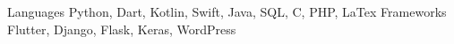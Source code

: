 
\begin{cvskills}
  \cvskill
    {Languages} %
    {Python, Dart, Kotlin, Swift, Java, SQL, C, PHP, LaTex} %
  \vspace{0.5mm}
  \cvskill
    {Frameworks} %
    {Flutter, Django, Flask, Keras, WordPress} %
\end{cvskills}
